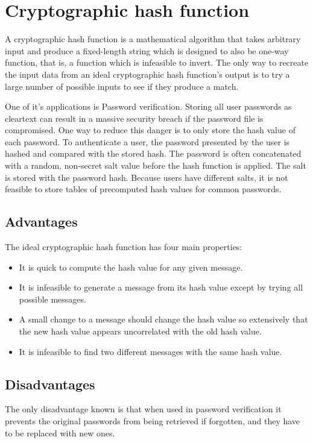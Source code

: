 \pagebreak

\section{Cryptographic hash function}
\par A cryptographic hash function is a mathematical algorithm that takes arbitrary input and produce a fixed-length string which is designed to also be one-way function, that is, a function which is infeasible to invert. The only way to recreate the input data from an ideal cryptographic hash function's output is to try a large number of possible inputs to see if they produce a match. \par
One of it's applications is Password verification. Storing all user passwords as cleartext can result in a massive security breach if the password file is compromised. One way to reduce this danger is to only store the hash value of each password. To authenticate a user, the password presented by the user is hashed and compared with the stored hash. The password is often concatenated with a random, non-secret salt value before the hash function is applied. The salt is stored with the password hash. Because users have different salts, it is not feasible to store tables of precomputed hash values for common passwords. 
\subsection{Advantages}
The ideal cryptographic hash function has four main properties:
\begin{itemize}
	\item It is quick to compute the hash value for any given message.
	\item It is infeasible to generate a message from its hash value except by trying all possible messages.
	\item A small change to a message should change the hash value so extensively that the new hash value appears uncorrelated with the old hash value.
	\item It is infeasible to find two different messages with the same hash value.
\end{itemize}
\subsection{Disadvantages}
The only disadvantage known is that when used in password verification it prevents the original passwords from being retrieved if forgotten, and they have to be replaced with new ones.
\pagebreak
